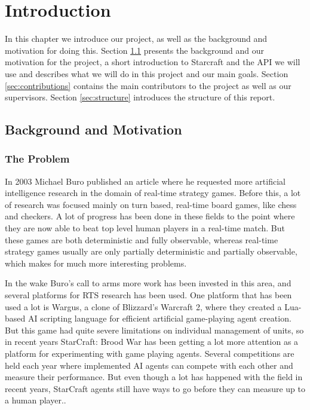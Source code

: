 
\chapter{Introduction}
In this chapter we introduce our project, as well as the background and motivation for doing this. Section \ref{sec:background} presents the background and our motivation for the project, a short introduction to Starcraft and the API we will use and describes what we will do in this project and our main goals. Section \ref{sec:contributions} contains the main contributors to the project as well as our supervisors. Section \ref{sec:structure} introduces the structure of this report.
\section{Background and Motivation}
\label{sec:background}
\subsection{The Problem}
In 2003 Michael Buro published an article where he requested more artificial
intelligence research in the domain of real-time strategy
games.\cite{buro2003real} Before this, a lot of research was focused mainly on
turn based, real-time board games, like chess and checkers. A lot of
progress has been done in these fields to the point where they are now able to
beat top level human players in a real-time match. \cite{campbell2002deep} But
these games are both deterministic and fully observable, whereas real-time
strategy games usually are only partially deterministic and partially
observable, which makes for much more interesting problems.

In the wake Buro's call to arms more work has been invested in this area, and
several platforms for RTS research has been used. One platform that has been
used a lot is Wargus\cite{wargus}, a clone of Blizzard's Warcraft 2, where they
created a Lua-based AI scripting language for efficient artificial game-playing
agent creation. But this game had quite severe limitations on individual
management of units, so in recent years StarCraft: Brood War has been getting a
lot more attention as a platform for experimenting with game playing agents.
Several competitions are held each year where implemented AI agents can
compete with each other and measure their performance. But even though a lot has
happened with the field in recent years, StarCraft agents still have ways to go
before they can measure up to a human player.\cite{eisbotvsfong}.

